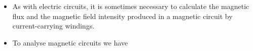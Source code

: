 
\begin{ELunit}


\begin{itemize}
\tightlist
\item
  As with electric circuits, it is sometimes necessary to calculate the magnetic flux and the magnetic field intensity produced in a magnetic circuit by current-carrying windings.
\item
  To analyse magnetic circuits we have
\end{itemize}


\end{ELunit}

